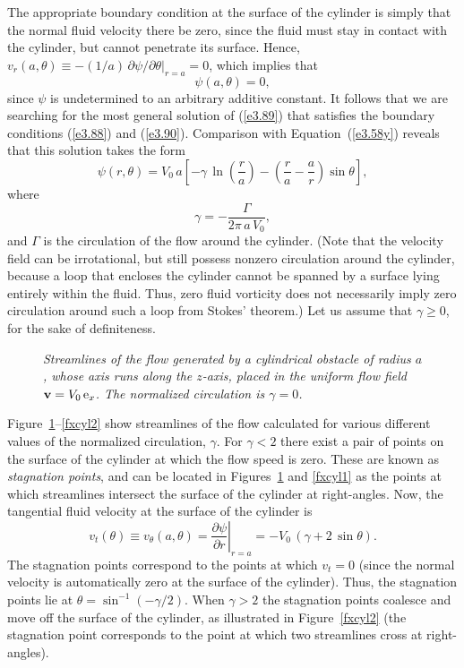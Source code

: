 The appropriate boundary condition at the surface of the cylinder is simply that the normal fluid
velocity there be zero, since the fluid must stay in contact with the cylinder, but cannot penetrate its
surface. Hence, $v_r(a,\theta) \equiv -(1/a)\,\partial\psi/\partial \theta|_{r=a} = 0$, which implies that
\begin{equation}\label{e3.90}
\psi(a,\theta)= 0,
\end{equation}
since $\psi$ is undetermined to an arbitrary additive constant.  It follows that we are searching for the most
general solution of (\ref{e3.89}) that satisfies the boundary conditions (\ref{e3.88}) and (\ref{e3.90}). 
Comparison with Equation~(\ref{e3.58y}) reveals that this solution takes the form
\begin{equation}
\psi(r,\theta) = V_0\,a\left[-\gamma\,\ln\left(\frac{r}{a}\right)-\left(\frac{r}{a}-\frac{a}{r}\right)\sin\theta\right],
\end{equation}
where
\begin{equation}
\gamma = -\frac{\Gamma}{2\pi\,a\,V_0},
\end{equation}
and $\Gamma$ is the circulation of the flow around the cylinder. 
(Note that the velocity field can be irrotational, but still possess nonzero circulation
around the cylinder, because a loop that encloses the cylinder cannot be spanned
by a surface lying entirely within the fluid. Thus, zero fluid vorticity does not
necessarily imply zero circulation around such a loop from Stokes' theorem.) Let us assume that $\gamma\geq 0$, for the
sake of definiteness. 

\begin{figure}
\epsfysize=3in
\centerline{}
\caption{\em Streamlines of the flow generated by a cylindrical obstacle of radius $a$, whose axis runs  along the $z$-axis,
placed in the uniform flow field ${\bf v}= V_0\,{\rm e}_x$. The normalized circulation is $\gamma=0$. }\label{fxcyl}
\end{figure}

Figure~\ref{fxcyl}--\ref{fxcyl2} show streamlines of the flow calculated for various different values of the normalized circulation,
$\gamma$. For $\gamma<2$ there exist  a pair of  points on the surface of the
cylinder at which the flow speed is zero. These are known as {\em stagnation points}, and can be located in Figures~\ref{fxcyl}
and \ref{fxcyl1} as the points at which streamlines intersect the surface of the cylinder at right-angles. Now, the
tangential fluid velocity at the surface of the cylinder is
\begin{equation}
v_t(\theta) \equiv v_\theta(a,\theta) = \left.\frac{\partial\psi}{\partial r}\right|_{r=a} = -V_0\,(\gamma+2\,\sin\theta).
\end{equation}
The stagnation points correspond to the points at which $v_t=0$ (since the normal velocity is automatically 
zero at the surface of the cylinder). Thus, the stagnation points lie at $\theta = \sin^{-1}(-\gamma/2)$. When $\gamma>2$
the stagnation points coalesce and move off the surface of the cylinder, as illustrated in Figure~\ref{fxcyl2} (the stagnation point
corresponds to the point at which two streamlines cross at right-angles). 

